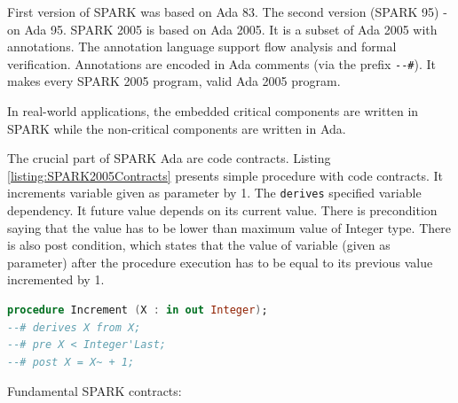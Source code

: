 First version of SPARK was based on Ada 83. The second version (SPARK 95) - on Ada 95. SPARK 2005 is based on Ada 2005. It is a subset of Ada 2005 with annotations. The annotation language support flow analysis and formal verification. Annotations are encoded in Ada comments (via the prefix \lstinline{--#}). It makes every SPARK 2005 program, valid Ada 2005 program. 

In real-world applications, the embedded critical components are written in SPARK while the non-critical components are written in Ada.

The crucial part of SPARK Ada are code contracts. Listing \ref{listing:SPARK2005Contracts} presents simple procedure with code contracts. It increments variable given as parameter by 1. The \lstinline{derives} specified variable dependency. It future value depends on its current value. There is precondition saying that the value has to be lower than maximum value of Integer type. There is also post condition, which states that the value of variable (given as parameter) after the procedure execution has to be equal to its previous value incremented by 1.

\begin{lstlisting}[language=ada, frame=single, gobble=0, caption={Sample SPARK procedure with code contracts}, label={listing:SPARK2005Contracts}]
procedure Increment (X : in out Integer);
--# derives X from X;
--# pre X < Integer'Last;
--# post X = X~ + 1;
\end{lstlisting} 


Fundamental SPARK contracts:

